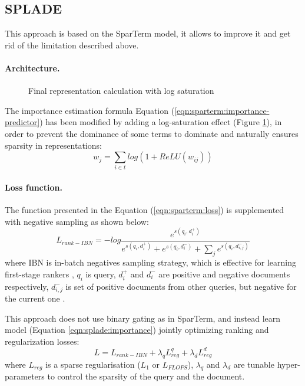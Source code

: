 \documentclass[
    twocolumn,
]{ceurart}
\begin{document}
    \subsection{SPLADE}

    This approach is based on the SparTerm model, it allows to improve it and get rid
    of the limitation described above.

    \paragraph{Architecture.}
    \begin{figure}[h]
        \centering
        \def\svgwidth{\columnwidth}
        
        \caption{Final representation calculation with log saturation}
        \label{fig:SPLADE}
    \end{figure}
    The importance estimation formula Equation (\ref{eqn:sparterm:importance-predictor})
    has been modified by adding a log-saturation effect (Figure \ref{fig:SPLADE}), in order to
    prevent the dominance of some terms to dominate and naturally ensures sparsity in
    representations:
    \begin{equation}
        \label{eqn:splade:importance}
        w_j=\sum_{i \in t}log(1+ReLU(w_{ij}))
    \end{equation}

    \paragraph{Loss function.}
    The function presented in the Equation (\ref{eqn:sparterm:loss}) is supplemented with negative
    sampling as shown below:
    \begin{equation}
        L_{rank-IBN}=-log
        \frac{
            e^{s(q_i,d_i^+)}
        }{
            e^{s(q_i,d_i^+)} +
            e^{s(q_i,d_i^-)} +
            \sum_j e^{s(q_i,d_{i,j}^-)}
        }
    \end{equation}
    where IBN is in-batch negatives sampling strategy, which is effective for learning first-stage
    rankers \cite{IBN1,IBN2,IBN3}, $q_i$ is query, $d_i^+$ and $d_i^-$ are positive and negative
    documents respectively, ${d_{i,j}^-}$ is set of positive documents from other queries,
    but negative for the current one \cite{SPLADE}.

    This approach does not use binary gating as in SparTerm, and instead learn model (Equation
    \ref{eqn:splade:importance}) jointly optimizing ranking and regularization losses:
    \begin{equation}
        L = L_{rank-IBN} + \lambda_q L^q_{reg} + \lambda_d L^d_{reg}
    \end{equation}
    where $L_{reg}$ is a sparse regularisation ($L_1$ or $L_{FLOPS}$), $\lambda_q$ and
    $\lambda_d$ are tunable hyper-parameters to control the sparsity of the query and the
    document. \newline
\end{document}
